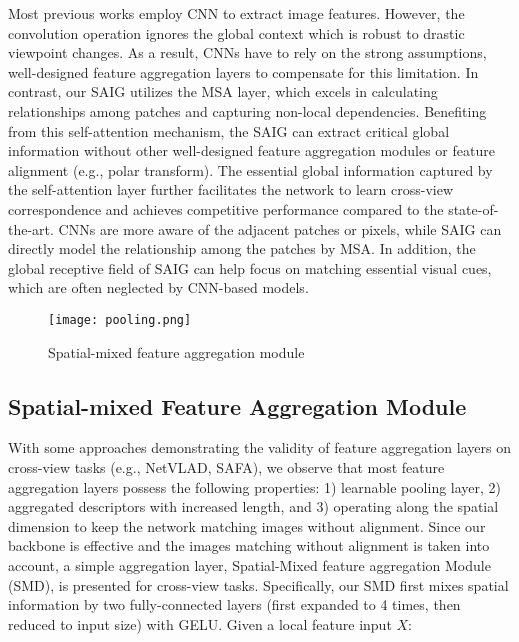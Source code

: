 \documentclass[sn-basic,iicol]{sn-jnl}
\theoremstyle{thmstyletwo}\newtheorem{example}{Example}\newtheorem{remark}{Remark}
\theoremstyle{thmstylethree}\newtheorem{definition}{Definition}
\begin{document}
 Most previous works employ CNN to extract image features. However, the convolution operation ignores the global context which is robust to drastic viewpoint changes. As a result, CNNs have to rely on the strong assumptions, well-designed feature aggregation layers to compensate for this limitation.
In contrast, our SAIG utilizes the MSA layer, which excels in calculating relationships among patches and capturing non-local dependencies. Benefiting from this self-attention mechanism, the SAIG can extract critical global information without other well-designed feature aggregation modules or feature alignment (e.g., polar transform). The essential global information captured by the self-attention layer further facilitates the network to learn cross-view correspondence and achieves competitive performance compared to the state-of-the-art. CNNs are more aware of the adjacent patches or pixels, while SAIG can directly model the relationship among the patches by MSA. In addition, the global receptive field of SAIG can help focus on matching essential visual cues, which are often neglected by CNN-based models.


\begin{figure}
\centering
\texttt{[image: pooling.png]}
\caption{Spatial-mixed feature aggregation module} 
\label{pool_layer}
\vspace{-12pt}
\end{figure}

\subsection{Spatial-mixed Feature Aggregation Module}
With some approaches demonstrating the validity of feature aggregation layers on cross-view tasks (e.g., NetVLAD, SAFA), we observe that most feature aggregation layers possess the following properties: 1) learnable pooling layer, 2) aggregated descriptors with increased length, and 3) operating along the spatial dimension to keep the network matching images without alignment. Since our backbone is effective and the images matching without alignment is taken into account, a simple aggregation layer, Spatial-Mixed feature aggregation Module (SMD), is presented for cross-view tasks. Specifically, our SMD first mixes spatial information by two fully-connected layers (first expanded to 4 times, then reduced to input size) with GELU. Given a local feature input $X$:
\end{document}
